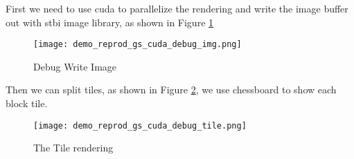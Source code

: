 First we need to use cuda to parallelize the rendering and write the image buffer out with stbi image library, as shown in Figure \ref{fig:reprod_gs_cuda_debug_img}

\begin{figure}[H]
    \centering
    \texttt{[image: demo\_reprod\_gs\_cuda\_debug\_img.png]}
    \caption{Debug Write Image }
    \label{fig:reprod_gs_cuda_debug_img}
\end{figure}

Then we can split tiles, as shown in Figure \ref{fig:reprod_gs_cuda_debug_tile}, we use chessboard to show each block tile.

\begin{figure}[H]
    \centering
        \texttt{[image: demo\_reprod\_gs\_cuda\_debug\_tile.png]}
        \caption{The Tile rendering}
    \label{fig:reprod_gs_cuda_debug_tile}
\end{figure}
